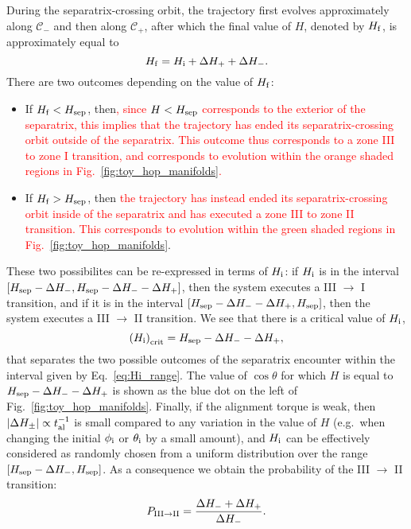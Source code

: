 \documentclass[
        fleqn,
        usenatbib,
        referee
    ]{mnras}
\newcommand*{\abs}[1]{\left|#1\right|}
\newcommand*{\p}[1]{\left(#1\right)}
\newcommand*{\s}[1]{\left[#1\right]}
\begin{document}
During the separatrix-crossing orbit, the trajectory first evolves
approximately along $\mathcal{C}_-$ and then along $\mathcal{C}_+$, after which
the final value of $H$, denoted by $H_{\rm f}$, is approximately equal to
\begin{equation}
    H_{\rm f} = H_{\rm i} + \Delta H_+ + \Delta H_-.
\end{equation}
There are two outcomes depending on the value of $H_{\rm f}$:
\begin{itemize}
    \item If $H_{\rm f} < H_{\rm sep}$, then\textcolor{red}{, since $H < H_{\rm
        sep}$ corresponds to the exterior of the separatrix, this implies that
        the trajectory has ended its separatrix-crossing orbit outside of the
        separatrix. This outcome thus corresponds to a zone III to zone I
        transition, and corresponds to evolution within the orange shaded
        regions in Fig.~\ref{fig:toy_hop_manifolds}.}

    \item If $H_{\rm f} > H_{\rm sep}$, then \textcolor{red}{the trajectory has
        instead ended its separatrix-crossing orbit inside of the separatrix and
        has executed a zone III to zone II transition. This corresponds to
        evolution within the green shaded regions in
        Fig.~\ref{fig:toy_hop_manifolds}}.
\end{itemize}
These two possibilites can be re-expressed in terms of $H_{\rm i}$:
if $H_{\rm i}$ is in the interval $\s{H_{\rm sep} - \Delta H_-, H_{\rm sep} -
\Delta H_{-} - \Delta H_+}$, then the system executes a III $\to$ I transition,
and if it is in the interval $\s{H_{\rm sep} - \Delta H_- - \Delta H_+, H_{\rm
sep}}$, then the system executes a III $\to$ II transition. We see that there is
a critical value of $H_{\rm i}$,
\begin{equation}
    \p{H_{\rm i}}_{\rm crit} = H_{\rm sep} - \Delta H_{-} - \Delta H_+,
        \label{eq:def_Hicrit}
\end{equation}
that separates the two possible outcomes of the separatrix encounter within the
interval given by Eq.~\eqref{eq:Hi_range}. The value of $\cos \theta$ for which
$H$ is equal to $H_{\rm sep} - \Delta H_{-} - \Delta H_+$ is shown as the blue
dot on the left of Fig.~\ref{fig:toy_hop_manifolds}. Finally, if the alignment
torque is weak, then $\abs{\Delta H_{\pm}} \propto t_{\rm al}^{-1}$ is small
compared to any variation in the value of $H$ (e.g.\ when changing the initial
$\phi_{\rm i}$ or $\theta_{\rm i}$ by a small amount), and $H_{\rm i}$ can be
effectively considered as randomly chosen from a uniform distribution over
the range $\s{H_{\rm sep} - \Delta H_-, H_{\rm sep}}$. As a consequence we
obtain the probability of the III $\to$ II transition:
\begin{equation}
    P_{\rm III \to II} = \frac{\Delta H_- + \Delta H_+}{\Delta H_-}.
        \label{eq:def_P32_toy}
\end{equation}
\end{document}
